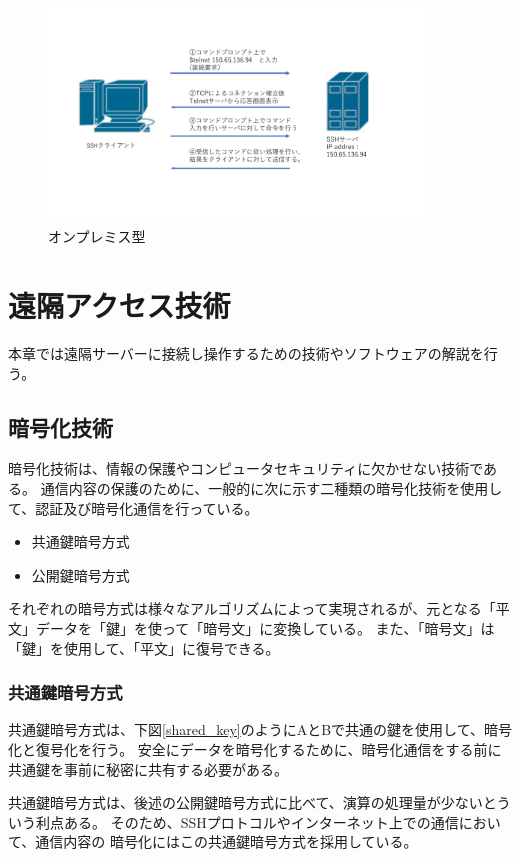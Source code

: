 \documentclass[11pt,a4j,titlepage]{jreport}
\begin{document}
\begin{figure}[h]
    \centering
    \includegraphics*[width=0.9\textwidth,page=15]{graphs/network_archtecture.pdf}
    \caption{オンプレミス型}
    \label{onpremise_graph}
\end{figure}




\chapter{遠隔アクセス技術}
本章では遠隔サーバーに接続し操作するための技術やソフトウェアの解説を行う。

\section{暗号化技術}
暗号化技術は、情報の保護やコンピュータセキュリティに欠かせない技術である。
通信内容の保護のために、一般的に次に示す二種類の暗号化技術を使用して、認証及び暗号化通信を行っている。
\begin{itemize}
    \item 共通鍵暗号方式
    \item 公開鍵暗号方式
\end{itemize}
それぞれの暗号方式は様々なアルゴリズムによって実現されるが、元となる「平文」データを「鍵」を使って「暗号文」に変換している。
また、「暗号文」は「鍵」を使用して、「平文」に復号できる。

\subsection{共通鍵暗号方式}
共通鍵暗号方式は、下図\ref{shared_key}のようにAとBで共通の鍵を使用して、暗号化と復号化を行う。
安全にデータを暗号化するために、暗号化通信をする前に共通鍵を事前に秘密に共有する必要がある。

共通鍵暗号方式は、後述の公開鍵暗号方式に比べて、演算の処理量が少ないとういう利点ある。
そのため、SSHプロトコルやインターネット上での通信において、通信内容の
暗号化にはこの共通鍵暗号方式を採用している。
\end{document}
